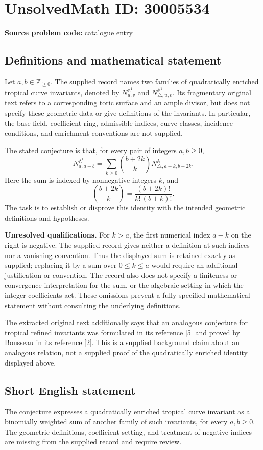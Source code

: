 \documentclass[11pt]{article}
\newcommand{\Z}{\mathbb{Z}}
\begin{document}
\section*{UnsolvedMath ID: 30005534}
\textbf{Source problem code:} catalogue entry
\subsection{Definitions and mathematical statement}
Let \(a,b\in\Z_{\geq 0}\). The supplied record names two families of quadratically enriched tropical curve invariants, denoted by \(N^{\mathbb A^1}_{u,v}\) and \(N^{\mathbb A^1}_{\triangle,u,v}\). Its fragmentary original text refers to a corresponding toric surface and an ample divisor, but does not specify these geometric data or give definitions of the invariants. In particular, the base field, coefficient ring, admissible indices, curve classes, incidence conditions, and enrichment conventions are not supplied.

The stated conjecture is that, for every pair of integers \(a,b\geq 0\),
\[
N^{\mathbb A^1}_{a,a+b}
=
\sum_{k\geq 0}\binom{b+2k}{k}
N^{\mathbb A^1}_{\triangle,a-k,b+2k}.
\]
Here the sum is indexed by nonnegative integers \(k\), and
\[
\binom{b+2k}{k}=\frac{(b+2k)!}{k!\,(b+k)!}.
\]
The task is to establish or disprove this identity with the intended geometric definitions and hypotheses.

\textbf{Unresolved qualifications.} For \(k>a\), the first numerical index \(a-k\) on the right is negative. The supplied record gives neither a definition at such indices nor a vanishing convention. Thus the displayed sum is retained exactly as supplied; replacing it by a sum over \(0\leq k\leq a\) would require an additional justification or convention. The record also does not specify a finiteness or convergence interpretation for the sum, or the algebraic setting in which the integer coefficients act. These omissions prevent a fully specified mathematical statement without consulting the underlying definitions.

The extracted original text additionally says that an analogous conjecture for tropical refined invariants was formulated in its reference [5] and proved by Bousseau in its reference [2]. This is a supplied background claim about an analogous relation, not a supplied proof of the quadratically enriched identity displayed above.
\subsection{Short English statement}
The conjecture expresses a quadratically enriched tropical curve invariant as a binomially weighted sum of another family of such invariants, for every \(a,b\geq 0\). The geometric definitions, coefficient setting, and treatment of negative indices are missing from the supplied record and require review.
\end{document}
